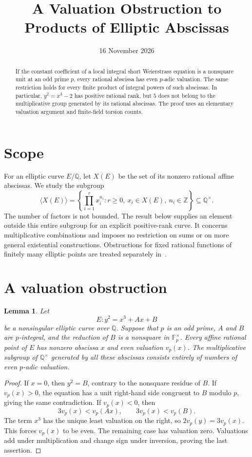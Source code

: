 \documentclass[11pt,a4paper]{article}
\title{A Valuation Obstruction to Products of Elliptic Abscissas}
\author{}\date{16 November 2026}
\newtheorem{lemma}[theorem]{Lemma}
\theoremstyle{definition}\newtheorem{definition}[theorem]{Definition}
\theoremstyle{remark}\newtheorem{remark}[theorem]{Remark}
\newcommand{\Q}{\mathbb Q}\newcommand{\Z}{\mathbb Z}
\begin{document}
\maketitle
\begin{abstract}
If the constant coefficient of a local integral short Weierstrass equation
is a nonsquare unit at an odd prime $p$, every rational abscissa has
even $p$-adic valuation. The same restriction holds for every finite
product of integral powers of such abscissas. In particular,
$y^2=x^3-2$ has positive rational rank, but $5$ does not belong to
the multiplicative group generated by its rational abscissas.
The proof uses an elementary valuation argument and finite-field
torsion counts.
\end{abstract}

\section{Scope}
For an elliptic curve $E/\Q$, let $X(E)$ be the set of its nonzero
rational affine abscissas. We study the subgroup
\[
 \langle X(E)\rangle=
 \left\{\prod_{i=1}^r x_i^{n_i}:
       r\ge0,\ x_i\in X(E),\ n_i\in\Z\right\}\subseteq\Q^\times.
\]
The number of factors is not bounded. The result below supplies an
element outside this entire subgroup for an explicit positive-rank
curve. It concerns multiplicative combinations and imposes no
restriction on sums or on more general existential constructions.
Obstructions for fixed rational functions of finitely many elliptic
points are treated separately in~\cite{EllipticRatios}.

\section{A valuation obstruction}
\begin{lemma}\label{lem:abscissa-parity}
Let
\[
                       E:y^2=x^3+Ax+B
\]
be a nonsingular elliptic curve over $\Q$. Suppose that $p$ is
an odd prime, $A$ and $B$ are $p$-integral, and the reduction
of $B$ is a nonsquare in $\mathbb F_p^\times$.
Every affine rational point of $E$ has nonzero abscissa $x$
and even valuation $v_p(x)$. The multiplicative subgroup of
$\Q^\times$ generated by all these abscissas consists entirely
of numbers of even $p$-adic valuation.
\end{lemma}
\begin{proof}
If $x=0$, then $y^2=B$, contrary to the nonsquare residue of
$B$. If $v_p(x)>0$, the equation has a unit right-hand side
congruent to $B$ modulo $p$, giving the same contradiction.
If $v_p(x)<0$, then
\[
        3v_p(x)<v_p(Ax),\qquad 3v_p(x)<v_p(B).
\]
The term $x^3$ has the unique least valuation on the right,
so $2v_p(y)=3v_p(x)$. This forces $v_p(x)$ to be even.
The remaining case has valuation zero. Valuations add under
multiplication and change sign under inversion, proving the
last assertion.
\end{proof}
\end{document}
